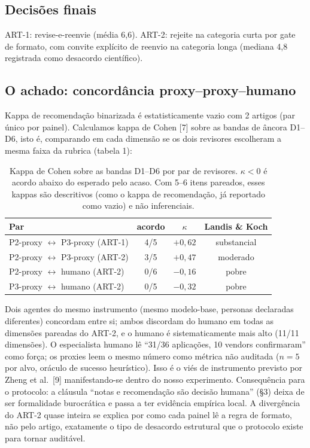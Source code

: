 \documentclass[10pt,a4paper,twocolumn]{article}
\begin{document}
\subsection{Decisões finais}

ART-1: revise-e-reenvie (média 6,6). ART-2: rejeite na categoria curta por gate de formato, com convite explícito de reenvio na categoria longa (mediana 4,8 registrada como desacordo científico).

\subsection{O achado: concordância proxy--proxy--humano}

Kappa de recomendação binarizada é estatisticamente vazio com 2 artigos (par único por painel). Calculamos kappa de Cohen [7] sobre as bandas de âncora D1--D6, isto é, comparando em cada dimensão se os dois revisores escolheram a mesma faixa da rubrica (tabela 1):

\begin{table}[h]
\centering
\footnotesize
\setlength{\tabcolsep}{3pt}
\begin{tabular}{lccc}
\toprule
Par & acordo & $\kappa$ & Landis \& Koch \\
\midrule
P2-proxy $\leftrightarrow$ P3-proxy (ART-1) & 4/5 & $+0{,}62$ & substancial \\
P2-proxy $\leftrightarrow$ P3-proxy (ART-2) & 3/5 & $+0{,}47$ & moderado \\
P2-proxy $\leftrightarrow$ humano (ART-2) & 0/6 & $-0{,}16$ & pobre \\
P3-proxy $\leftrightarrow$ humano (ART-2) & 0/5 & $-0{,}32$ & pobre \\
\bottomrule
\end{tabular}
\caption{Kappa de Cohen sobre as bandas D1--D6 por par de revisores. $\kappa < 0$ é acordo abaixo do esperado pelo acaso. Com 5--6 itens pareados, esses kappas são descritivos (como o kappa de recomendação, já reportado como vazio) e não inferenciais.}
\end{table}

Dois agentes do mesmo instrumento (mesmo modelo-base, personas declaradas diferentes) concordam entre si; ambos discordam do humano em todas as dimensões pareadas do ART-2, e o humano é sistematicamente mais alto (11/11 dimensões). O especialista humano lê ``31/36 aplicações, 10 vendors confirmaram'' como força; os proxies leem o mesmo número como métrica não auditada ($n = 5$ por alvo, oráculo de sucesso heurístico). Isso é o viés de instrumento previsto por Zheng et al.\ [9] manifestando-se dentro do nosso experimento. Consequência para o protocolo: a cláusula ``notas e recomendação são decisão humana'' (\S3) deixa de ser formalidade burocrática e passa a ter evidência empírica local. A divergência do ART-2 quase inteira se explica por como cada painel lê a regra de formato, não pelo artigo, exatamente o tipo de desacordo estrutural que o protocolo existe para tornar auditável.
\end{document}
